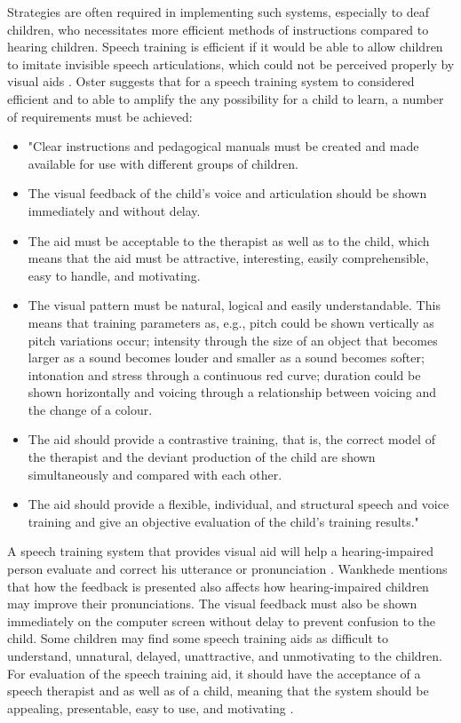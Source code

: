 Strategies are often required in implementing such systems, especially to deaf children, who necessitates more efficient methods of instructions compared to hearing children. Speech training is efficient if it would be able to allow children to imitate invisible speech articulations, which could not be perceived properly by visual aids \cite{oster:1996:cac}. Oster \citeyear{oster:1996:cac} suggests that for a speech training system to considered efficient and to able to amplify the any possibility for a child to learn, a number of requirements must be achieved:

\begin{itemize}
\item "Clear instructions and pedagogical manuals must be created and made available for use with different groups of children.
\item The visual feedback of the child’s voice and articulation should be shown immediately and without delay.
\item The aid must be acceptable to the therapist as well as to the child, which means that the aid must be attractive, interesting, easily comprehensible, easy to handle, and motivating.
\item The visual pattern must be natural, logical and easily understandable. This means that training parameters as, e.g., pitch could be shown vertically as pitch variations occur; intensity through the size of an object that becomes larger as a sound becomes louder and smaller as a sound becomes softer; intonation and stress through a continuous red curve; duration could be shown horizontally and voicing through a relationship between voicing and the change of a colour.
\item The aid should provide a contrastive training, that is, the correct model of the therapist and the deviant production of the child are shown simultaneously and compared with each other.
\item The aid should provide a flexible, individual, and structural speech and voice training and give an objective evaluation of the child’s training results." \cite{oster:1996:cac}
\end{itemize}

A speech training system that provides visual aid will help a hearing-impaired person evaluate and correct his utterance or pronunciation \cite{wankhede:2014:dvs}. Wankhede mentions that how the feedback is presented also affects how hearing-impaired children may improve their pronunciations. The visual feedback must also be shown immediately on the computer screen without delay to prevent confusion to the child. Some children may find some speech training aids as difficult to understand, unnatural, delayed, unattractive, and unmotivating to the children. For evaluation of the speech training aid, it should have the acceptance of a speech therapist and as well as of a child, meaning that the system should be appealing, presentable, easy to use, and motivating \cite{wankhede:2014:dvs}.

